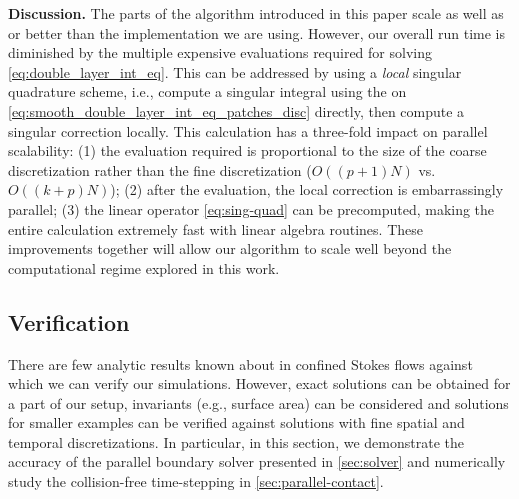 \textbf{Discussion. }
The parts of the algorithm introduced in this paper scale as well as
or better than the \fmm implementation we are using.  However, our
overall run time is diminished by the multiple expensive
\fmm evaluations required for solving \cref{eq:double_layer_int_eq}.
This can be addressed by using a \textit{local} singular quadrature scheme,
i.e., compute a singular integral using the \fmm on
\cref{eq:smooth_double_layer_int_eq_patches_disc} directly, then compute a
singular correction locally.
This calculation has a three-fold impact on parallel scalability: (1) the \fmm
evaluation required is proportional to the size of the coarse discretization
rather than the fine discretization ($O((p+1)N)$ vs.\ $O((k+p)N)$);
(2) after the \fmm evaluation, the local correction is embarrassingly parallel;
(3) the linear operator \cref{eq:sing-quad} can be precomputed, making the
entire calculation extremely fast with  linear algebra routines.
These improvements together will allow our algorithm to scale well beyond the
computational regime explored in this work.

\subsection{Verification}
There are few analytic results known about \rbcs in confined Stokes
flows against which we can verify our simulations. However,
exact solutions can be obtained for a part of our setup, invariants
(e.g., surface area) can be considered and solutions for smaller examples can
be verified against solutions with fine spatial and temporal discretizations.
In particular, in this section, we demonstrate the accuracy of the parallel boundary
solver presented in \cref{sec:solver} and numerically study the collision-free
time-stepping in \cref{sec:parallel-contact}. 

